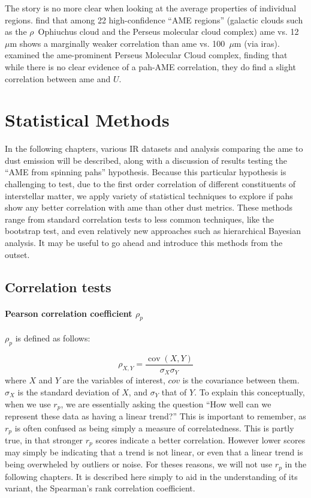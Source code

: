          The story is no more clear when looking at the average properties of individual regions. \cite{planckXV} find that among 22 high-confidence ``AME regions'' (galactic clouds such as the $\rho$~Ophiuchus cloud and the Perseus molecular cloud complex) \acrshort{ame} vs. 12~$\mu$m  shows a marginally weaker correlation than \acrshort{ame} vs. 100~$\mu$m (via \acrshort{iras}). \cite{tibbs11} examined the \acrshort{ame}-prominent Perseus Molecular Cloud complex, finding that while there is no clear evidence of a \acrshort{pah}-AME correlation, they do find a slight correlation between \acrshort{ame} and $U$.

\section{Statistical Methods}

    In the following chapters, various IR datasets and analysis comparing the \acrshort{ame} to dust emission will be described, along with a discussion of results testing the ``AME from spinning \acrshort{pah}s'' hypothesis. Because this particular hypothesis is challenging to test, due to the first order correlation of different constituents of interstellar matter, we apply variety of statistical techniques to explore if \acrshort{pah}s show any better correlation with \acrshort{ame} than other dust metrics. These methods range from standard correlation tests to less common techniques, like the bootstrap test, and even relatively new approaches such as hierarchical Bayesian analysis. It may be useful to go ahead and introduce this methods from the outset.

    \subsection{Correlation tests}

    \paragraph{Pearson correlation coefficient $\rho_{p}$ }
     $\rho_{p}$ is defined as follows:

     \begin{equation}
       \rho_{X,Y}= \frac{\operatorname{cov}(X,Y)}{\sigma_X \sigma_Y}
     \end{equation}
     where $X$ and $Y$ are the variables of interest, $cov$ is the covariance between them. $\sigma_{X}$ is the standard deviation of $X$, and $\sigma_{Y}$ that of $Y$.
   To explain this conceptually, when we use $r_{p}$, we are essentially asking the question ``How well can we represent these data as having a linear trend?'' This is important to remember, as $r_{p}$ is often confused as being simply a measure of correlatedness. This is partly true, in that stronger $r_{p}$ scores indicate a better correlation. However lower scores may simply be indicating that a trend is not linear, or even that a linear trend is being overwheled by outliers or noise. For theses reasons, we will not use $r_{p}$ in the following chapters. It is described here simply to aid in the understanding of its variant, the Spearman's rank correlation coefficient.

